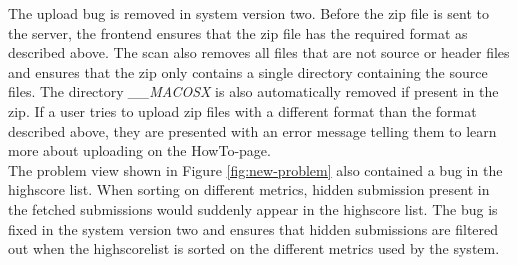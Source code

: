 The upload bug is removed in system version two. Before the zip file is sent to the server, the frontend ensures that the zip file has the required format as described above. The scan also removes all files that are not source or header files and ensures that the zip only contains a single directory containing the source files. The directory \textit{\_\_MACOSX} is also automatically removed if present in the zip. If a user tries to upload zip files with a different format than the format described above, they are presented with an error message telling them to learn more about uploading on the HowTo-page. \\

The problem view shown in Figure \ref{fig:new-problem} also contained a bug in the highscore list. When sorting on different metrics, hidden submission present in the fetched submissions would suddenly appear in the highscore list. The bug is fixed in the system version two and ensures that hidden submissions are filtered out when the highscorelist is sorted on the different metrics used by the system.

